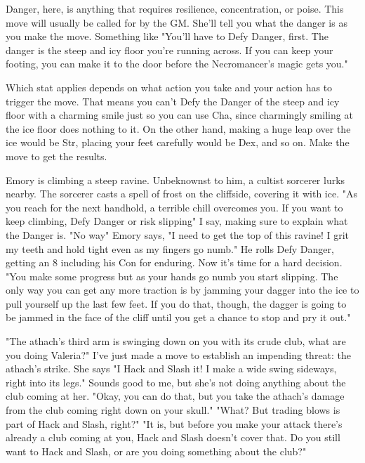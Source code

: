  

Danger, here, is anything that requires resilience, concentration, or poise. This move will usually be called for by the GM. She'll tell you what the danger is as you make the move. Something like "You'll have to Defy Danger, first. The danger is the steep and icy floor you're running across. If you can keep your footing, you can make it to the door before the Necromancer's magic gets you."

 

Which stat applies depends on what action you take and your action has to trigger the move. That means you can't Defy the Danger of the steep and icy floor with a charming smile just so you can use Cha, since charmingly smiling at the ice floor does nothing to it. On the other hand, making a huge leap over the ice would be Str, placing your feet carefully would be Dex, and so on. Make the move to get the results.

 
\startExample
Emory is climbing a steep ravine. Unbeknownst to him, a cultist sorcerer lurks nearby. The sorcerer casts a spell of frost on the cliffside, covering it with ice. "As you reach for the next handhold, a terrible chill overcomes you. If you want to keep climbing, Defy Danger or risk slipping" I say, making sure to explain what the Danger is. "No way" Emory says, "I need to get the top of this ravine! I grit my teeth and hold tight even as my fingers go numb." He rolls Defy Danger, getting an 8 including his Con for enduring. Now it's time for a hard decision. "You make some progress but as your hands go numb you start slipping. The only way you can get any more traction is by jamming your dagger into the ice to pull yourself up the last few feet. If you do that, though, the dagger is going to be jammed in the face of the cliff until you get a chance to stop and pry it out."
\stopExample
 
\startExample
"The athach's third arm is swinging down on you with its crude club, what are you doing Valeria?" I've just made a move to establish an impending threat: the athach's strike. She says "I Hack and Slash it! I make a wide swing sideways, right into its legs." Sounds good to me, but she's not doing anything about the club coming at her. "Okay, you can do that, but you take the athach's damage from the club coming right down on your skull." "What? But trading blows is part of Hack and Slash, right?" "It is, but before you make your attack there's already a club coming at you, Hack and Slash doesn't cover that. Do you still want to Hack and Slash, or are you doing something about the club?"
\stopExample
 
